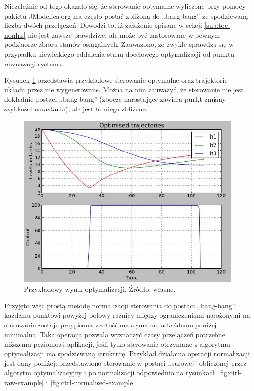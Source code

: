 Niezależnie od tego okazało się, że sterowanie optymalne wyliczone przy pomocy pakietu JModelica.org ma często postać zbliżoną do ,,bang-bang'' ze spodziewaną liczbą dwóch przełączeń. Dowodzi to, iż założenie opisane w sekcji \ref{sub:toc-nonlnr} nie jest zawsze prawdziwe, ale może być zastosowane w pewnym podzbiorze zbioru stanów osiągalnych. Zauważono, że zwykle sprawdza się w przypadku niewielkiego oddalenia stanu docelowego optymalizacji od punktu równowagi systemu.

Rysunek \ref{fig:optimisationexample} przedstawia przykładowe sterowanie optymalne oraz trajektorie układu przez nie wygenerowane. Można na nim zauważyć, że sterowanie nie jest dokładnie postaci ,,bang-bang'' (zbocze narastające zawiera punkt zmiany szybkości narastania), ale jest to niego zbliżone.

\begin{figure}[ht]
    \centering
    \includegraphics{Grafika/optimisation_example}
    \caption{Przykładowy wynik optymalizacji. Źródło: własne.}
    \label{fig:optimisationexample}
\end{figure}

Przyjęto więc prostą metodę normalizacji sterowania do postaci ,,bang-bang'': każdemu punktowi powyżej połowy różnicy między ograniczeniami nałożonymi na sterowanie zostaje przypisana wartość maksymalna, a każdemu poniżej - minimalna. Taka operacja pozwala wyznaczyć czasy przełączeń potrzebne niższemu poziomowi aplikacji, jeśli tylko sterowanie otrzymane z algorytmu optymalizacji ma spodziewaną strukturę. Przykład działania operacji normalizacji jest dany poniżej: przedstawiono sterowanie w postaci ,,surowej'' obliczonej przez algorytm optymalizacyjny i po normalizacji odpowiednio na rysunkach \ref{fig:ctrl-raw-example} i \ref{fig:ctrl-normalised-example}.

